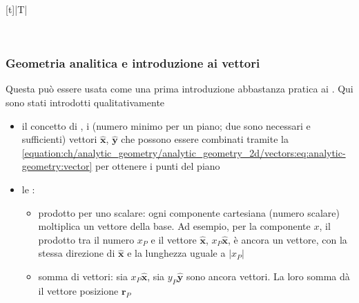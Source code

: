 \documentclass[letterpaper,10pt,italian]{jupyterBook}
\begin{document}
\begin{savenotes}\sphinxattablestart
\centering
\begin{tabulary}{\linewidth}[t]{|T|}
\hline

\sphinxAtStartPar
{}
\\
\hline
\end{tabulary}
\par
\sphinxattableend\end{savenotes}
\subsubsection*{Geometria analitica e introduzione ai vettori}

\sphinxAtStartPar
Questa può essere usata come una prima introduzione abbastanza pratica ai {\hyperref[\detokenize{ch/algebra/vector-algebra:math-hs-algebra-vector}]{}}. Qui sono stati introdotti qualitativamente
\begin{itemize}
\item {} 
\sphinxAtStartPar
il concetto di {\hyperref[\detokenize{ch/algebra/vector-algebra-def:math-hs-algebra-vector-def-basis}]{}}, i  (numero minimo per un piano; due sono necessari e sufficienti) vettori \(\hat{\mathbf{x}}\), \(\hat{\mathbf{y}}\) che possono essere combinati tramite la \eqref{equation:ch/analytic_geometry/analytic_geometry_2d/vectors:eq:analytic-geometry:vector} per ottenere  i punti del piano

\item {} 
\sphinxAtStartPar
le {\hyperref[\detokenize{ch/algebra/vector-algebra-def:math-hs-algebra-vector-def-operations}]{}}:
\begin{itemize}
\item {} 
\sphinxAtStartPar
prodotto per uno scalare: ogni componente cartesiana (numero scalare) moltiplica un vettore della base. Ad esempio, per la componente \(x\), il prodotto tra il numero \(x_P\) e il vettore \(\hat{\mathbf{x}}\), \(x_P \hat{\mathbf{x}}\), è ancora un vettore, con la stessa direzione di \(\hat{\mathbf{x}}\) e la lunghezza uguale a \(|x_P|\)

\item {} 
\sphinxAtStartPar
somma di vettori: sia \(x_P \hat{\mathbf{x}}\), sia \(y_P \hat{\mathbf{y}}\) sono ancora vettori. La loro somma dà il vettore posizione \(\mathbf{r}_P\)

\end{itemize}

\end{itemize}
\end{document}
